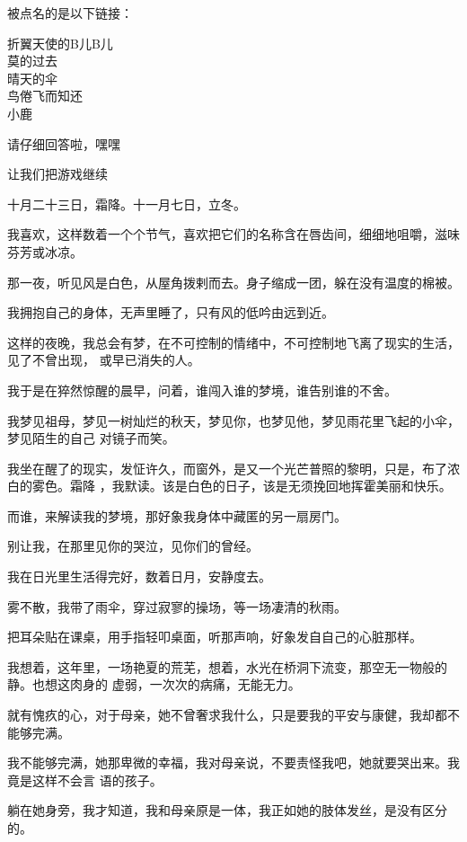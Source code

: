 \documentclass[12pt,a4paper]{article}
\def\blankrev{\vspace{1ex}}									%
\begin{document}
		\blankrev
		被点名的是以下链接：

		\indentenv{4\ccwd}{0\ccwd}{}
		折翼天使的B儿B儿 \\
		莫的过去 \\
		晴天的伞 \\
		鸟倦飞而知还 \\
		小鹿
		\endindentenv

		请仔细回答啦，嘿嘿


		让我们把游戏继续

	\endwriting



		十月二十三日，霜降。十一月七日，立冬。

		我喜欢，这样数着一个个节气，喜欢把它们的名称含在唇齿间，细细地咀嚼，滋味芬芳或冰凉。

		那一夜，听见风是白色，从屋角拨剌而去。身子缩成一团，躲在没有温度的棉被。

		我拥抱自己的身体，无声里睡了，只有风的低吟由远到近。

		这样的夜晚，我总会有梦，在不可控制的情绪中，不可控制地飞离了现实的生活，见了不曾出现，
	或早已消失的人。

		我于是在猝然惊醒的晨早，问着，谁闯入谁的梦境，谁告别谁的不舍。

		我梦见祖母，梦见一树灿烂的秋天，梦见你，也梦见他，梦见雨花里飞起的小伞，梦见陌生的自己
	对镜子而笑。

		我坐在醒了的现实，发怔许久，而窗外，是又一个光芒普照的黎明，只是，布了浓白的雾色。霜降
	，我默读。该是白色的日子，该是无须挽回地挥霍美丽和快乐。


		而谁，来解读我的梦境，那好象我身体中藏匿的另一扇房门。

		别让我，在那里见你的哭泣，见你们的曾经。


		我在日光里生活得完好，数着日月，安静度去。


		雾不散，我带了雨伞，穿过寂寥的操场，等一场凄清的秋雨。

		把耳朵贴在课桌，用手指轻叩桌面，听那声响，好象发自自己的心脏那样。


		我想着，这年里，一场艳夏的荒芜，想着，水光在桥洞下流变，那空无一物般的静。也想这肉身的
	虚弱，一次次的病痛，无能无力。


		就有愧疚的心，对于母亲，她不曾奢求我什么，只是要我的平安与康健，我却都不能够完满。


		我不能够完满，她那卑微的幸福，我对母亲说，不要责怪我吧，她就要哭出来。我竟是这样不会言
	语的孩子。

		躺在她身旁，我才知道，我和母亲原是一体，我正如她的肢体发丝，是没有区分的。
\end{document}

